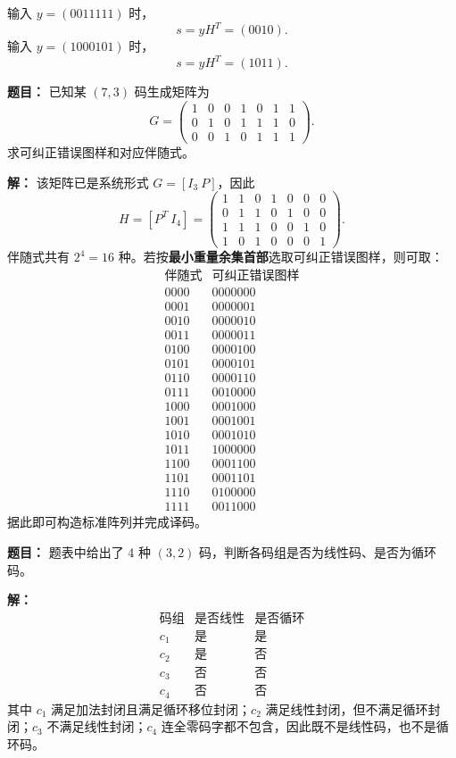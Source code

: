输入 $y=(0011111)$ 时，
\[
s=yH^T=(0010).
\]
输入 $y=(1000101)$ 时，
\[
s=yH^T=(1011).
\]

\medskip
{}
\textbf{题目：}
已知某 $(7,3)$ 码生成矩阵为
\[
G=
\begin{pmatrix}
1&0&0&1&0&1&1\\
0&1&0&1&1&1&0\\
0&0&1&0&1&1&1
\end{pmatrix}.
\]
求可纠正错误图样和对应伴随式。

\par\textbf{解：}
该矩阵已是系统形式 $G=[I_3\ P]$，因此
\[
H=[P^T\ I_4]
=
\begin{pmatrix}
1&1&0&1&0&0&0\\
0&1&1&0&1&0&0\\
1&1&1&0&0&1&0\\
1&0&1&0&0&0&1
\end{pmatrix}.
\]
伴随式共有 $2^4=16$ 种。若按\textbf{最小重量余集首部}选取可纠正错误图样，则可取：
\[
\begin{array}{c|c}
\text{伴随式} & \text{可纠正错误图样}\\
\hline
0000 & 0000000\\
0001 & 0000001\\
0010 & 0000010\\
0011 & 0000011\\
0100 & 0000100\\
0101 & 0000101\\
0110 & 0000110\\
0111 & 0010000\\
1000 & 0001000\\
1001 & 0001001\\
1010 & 0001010\\
1011 & 1000000\\
1100 & 0001100\\
1101 & 0001101\\
1110 & 0100000\\
1111 & 0011000
\end{array}
\]
据此即可构造标准阵列并完成译码。

\medskip
{}
\textbf{题目：}
题表中给出了 4 种 $(3,2)$ 码，判断各码组是否为线性码、是否为循环码。

\par\textbf{解：}
\[
\begin{array}{c|c|c}
\text{码组} & \text{是否线性} & \text{是否循环}\\
\hline
c_1 & \text{是} & \text{是}\\
c_2 & \text{是} & \text{否}\\
c_3 & \text{否} & \text{否}\\
c_4 & \text{否} & \text{否}
\end{array}
\]
其中 $c_1$ 满足加法封闭且满足循环移位封闭；$c_2$ 满足线性封闭，但不满足循环封闭；$c_3$ 不满足线性封闭；$c_4$ 连全零码字都不包含，因此既不是线性码，也不是循环码。

